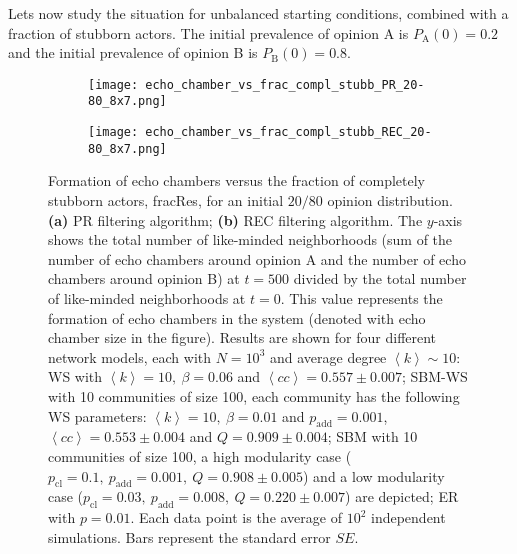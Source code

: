 \documentclass[11 pt , letterpaper , twoside , openright]{book}
\begin{document}
\newline
Lets now study the situation for unbalanced starting conditions, combined with a fraction of stubborn actors. The initial prevalence of opinion A is $P_\text{A}(0) = 0.2$ and the initial prevalence of opinion B is $P_\text{B}(0) = 0.8$.

\begin{figure}[H]
  \begin{subfigure}[b]{0.49\textwidth}
    \caption{}
  	\texttt{[image: echo\_chamber\_vs\_frac\_compl\_stubb\_PR\_20-80\_8x7.png]}
    \label{PR_frac_compl_stubb_20-80}
  \end{subfigure}
  \begin{subfigure}[b]{0.49\textwidth}
    \caption{}
  	\texttt{[image: echo\_chamber\_vs\_frac\_compl\_stubb\_REC\_20-80\_8x7.png]}
    \label{REC_frac_compl_stubb_20-80}
  \end{subfigure}
  \captionsetup{format=plain}
  \caption[Formation of echo chambers versus fraction of completely stubborn actors for the PR and REC filtering algorithms and an initial $20/80$ opinion distribution.]{Formation of echo chambers versus the fraction of completely stubborn actors, fracRes, for an initial $20/80$ opinion distribution. \textbf{(a)} PR filtering algorithm; \textbf{(b)} REC filtering algorithm. The $y$-axis shows the total number of like-minded neighborhoods (sum of the number of echo chambers around opinion A and the number of echo chambers around opinion B) at $t=500$ divided by the total number of like-minded neighborhoods at $t=0$. This value represents the formation of echo chambers in the system (denoted with echo chamber size in the figure). Results are shown for four different network models, each with $N=10^3$ and average degree $\left<k\right> \sim 10$: WS with $\left<k\right> =10,\ \beta = 0.06$ and $\left<cc\right> = 0.557 \pm 0.007$; SBM-WS with 10 communities of size 100, each community has the following WS parameters: $\left<k\right> = 10,\ \beta = 0.01$ and $p_{\text{add}} = 0.001$, $\left<cc\right> = 0.553 \pm 0.004$ and $Q = 0.909 \pm 0.004$; SBM with 10 communities of size 100, a high modularity case ($p_{\text{cl}} = 0.1,\ p_{\text{add}} = 0.001,\ Q = 0.908 \pm 0.005$) and a low modularity case ($p_{\text{cl}} = 0.03,\ p_{\text{add}} = 0.008,\ Q = 0.220 \pm 0.007$) are depicted; ER with $p= 0.01$. Each data point is the average of $10^2$ independent simulations. Bars represent the standard error $SE$.}
\label{echo_vs_frac_complStubb_PR-REC_20-80}
\end{figure}
\end{document}
